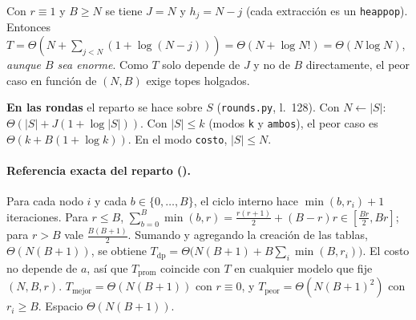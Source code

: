 \begin{observacion}
Con $r\equiv1$ y $B\ge N$ se tiene $J=N$ y $h_j=N-j$ (cada extracción es un \texttt{heappop}). Entonces $T=\Theta(N+\sum_{j<N}(1+\log(N-j)))=\Theta(N+\log N!)=\Theta(N\log N)$, \emph{aunque $B$ sea enorme}. Como $T$ solo depende de $J$ y no de $B$ directamente, el peor caso en función de $(N,B)$ exige topes holgados.
\end{observacion}
\noindent\textbf{En las rondas} el reparto se hace sobre $S$ (\texttt{rounds.py}, l.~128). Con $N\leftarrow|S|$: $\Theta(|S|+J(1+\log|S|))$. Con $|S|\le k$ (modos \texttt{k} y \texttt{ambos}), el peor caso es $\Theta(k+B(1+\log k))$. En el modo \texttt{costo}, $|S|\le N$.

\paragraph{Referencia exacta del reparto ().} Para cada nodo $i$ y cada $b\in\{0,\dots,B\}$, el ciclo interno hace $\min(b,r_i)+1$ iteraciones. Para $r\le B$, $\sum_{b=0}^{B}\min(b,r)=\tfrac{r(r+1)}2+(B-r)r\in[\tfrac{Br}{2},Br]$; para $r>B$ vale $\tfrac{B(B+1)}2$. Sumando y agregando la creación de las tablas, $\Theta(N(B+1))$, se obtiene $T_{\text{dp}}=\Theta\bigl(N(B+1)+B\sum_i\min(B,r_i)\bigr)$. El costo no depende de $a$, así que $T_{\text{prom}}$ coincide con $T$ en cualquier modelo que fije $(N,B,r)$. $T_{\text{mejor}}=\Theta(N(B+1))$ con $r\equiv0$, y $T_{\text{peor}}=\Theta(N(B+1)^2)$ con $r_i\ge B$. Espacio $\Theta(N(B+1))$.


